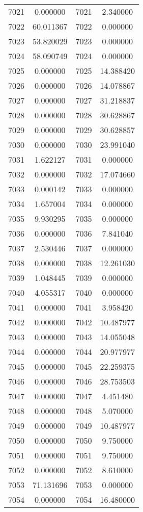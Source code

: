 \documentclass[12pt]{article}
\begin{document}
\begin{longtable}{@{}cccc@{}}
7021 & 0.000000 & 7021 & 2.340000 \\
7022 & 60.011367 & 7022 & 0.000000 \\
7023 & 53.820029 & 7023 & 0.000000 \\
7024 & 58.090749 & 7024 & 0.000000 \\
7025 & 0.000000 & 7025 & 14.388420 \\
7026 & 0.000000 & 7026 & 14.078867 \\
7027 & 0.000000 & 7027 & 31.218837 \\
7028 & 0.000000 & 7028 & 30.628867 \\
7029 & 0.000000 & 7029 & 30.628857 \\
7030 & 0.000000 & 7030 & 23.991040 \\
7031 & 1.622127 & 7031 & 0.000000 \\
7032 & 0.000000 & 7032 & 17.074660 \\
7033 & 0.000142 & 7033 & 0.000000 \\
7034 & 1.657004 & 7034 & 0.000000 \\
7035 & 9.930295 & 7035 & 0.000000 \\
7036 & 0.000000 & 7036 & 7.841040 \\
7037 & 2.530446 & 7037 & 0.000000 \\
7038 & 0.000000 & 7038 & 12.261030 \\
7039 & 1.048445 & 7039 & 0.000000 \\
7040 & 4.055317 & 7040 & 0.000000 \\
7041 & 0.000000 & 7041 & 3.958420 \\
7042 & 0.000000 & 7042 & 10.487977 \\
7043 & 0.000000 & 7043 & 14.055048 \\
7044 & 0.000000 & 7044 & 20.977977 \\
7045 & 0.000000 & 7045 & 22.259375 \\
7046 & 0.000000 & 7046 & 28.753503 \\
7047 & 0.000000 & 7047 & 4.451480 \\
7048 & 0.000000 & 7048 & 5.070000 \\
7049 & 0.000000 & 7049 & 10.487977 \\
7050 & 0.000000 & 7050 & 9.750000 \\
7051 & 0.000000 & 7051 & 9.750000 \\
7052 & 0.000000 & 7052 & 8.610000 \\
7053 & 71.131696 & 7053 & 0.000000 \\
7054 & 0.000000 & 7054 & 16.480000 \\

\end{longtable}
\end{document}
